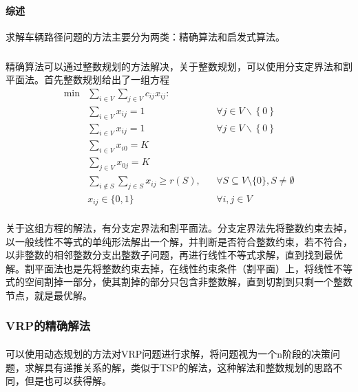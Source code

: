 \documentclass[UTF8,a4paper]{ctexart}
\begin{document}
\paragraph{综述}求解车辆路径问题的方法主要分为两类：精确算法和启发式算法。
\subparagraph{}精确算法可以通过整数规划的方法解决，关于整数规划，可以使用分支定界法和割平面法。首先整数规划给出了一组方程
\begin{align*}
    \min & \sum_{i\in V}\sum_{j \in V}c_{ij}x_{ij}\colon   &  &                                                     \\
         & \sum _{i\in V}x_{ij}=1                          &  & \forall j\in V\backslash \left\{0\right\}           \\
         & \sum _{i\in V}x_{ij}=1                          &  & \forall j\in V\backslash \left\{0\right\}           \\
         & \sum _{i\in V}x_{i0}=K                          &  &                                                     \\
         & \sum _{j\in V}x_{0j}=K                          &  &                                                     \\
         & \sum _{i\notin S}\sum _{j\in S}x_{ij}\geq r(S), &  & \forall S\subseteq V\setminus \{0\},S\neq \emptyset \\
         & x_{ij}\in \{0,1\}                               &  & \forall i,j\in V
\end{align*}
\paragraph{}关于这组方程的解法，有分支定界法和割平面法。分支定界法先将整数约束去掉，以一般线性不等式的单纯形法解出一个解，并判断是否符合整数约束，若不符合，以非整数的相邻整数分支出整数子问题，再进行线性不等式求解，直到找到最优解。割平面法也是先将整数约束去掉，在线性约束条件（割平面）上，将线性不等式的空间割掉一部分，使其割掉的部分只包含非整数解，直到切割到只剩一个整数节点，就是最优解。
\subsubsection{VRP的精确解法~\cite{qureshi2010exact}}
\paragraph{}可以使用动态规划的方法对VRP问题进行求解，将问题视为一个n阶段的决策问题，求解具有递推关系的解，类似于TSP的解法，这种解法和整数规划的思路不同，但是也可以获得解。
\end{document}
